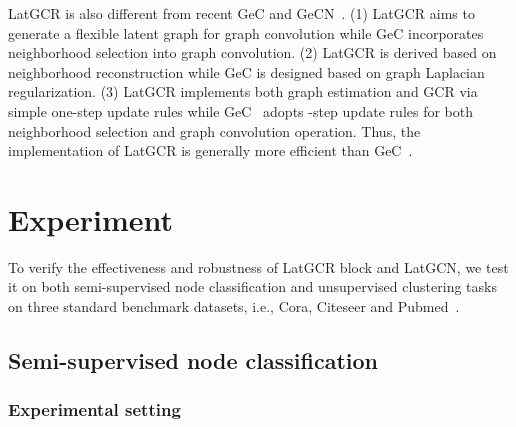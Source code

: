 \documentclass{article}
\begin{document}
LatGCR is also different from recent GeC and GeCN~\cite{GECN}.
(1) LatGCR aims to generate  a flexible latent graph for graph convolution while GeC incorporates  neighborhood selection into graph convolution.
(2) LatGCR is derived based on neighborhood reconstruction while GeC is designed based on graph Laplacian regularization.
(3) LatGCR implements both graph estimation and GCR via simple one-step update rules while  GeC~\cite{GECN} adopts -step update rules for both neighborhood selection and graph convolution operation. Thus, the implementation of LatGCR is generally more efficient than GeC~\cite{GECN}.



\section{Experiment}

To verify the effectiveness and robustness of LatGCR block and LatGCN, we test it on both semi-supervised node classification and unsupervised clustering tasks on three standard benchmark datasets, i.e., Cora, Citeseer and Pubmed~\cite{sen2008collective,prognn}.

\subsection{Semi-supervised node classification}

\subsubsection{Experimental setting}
\end{document}
